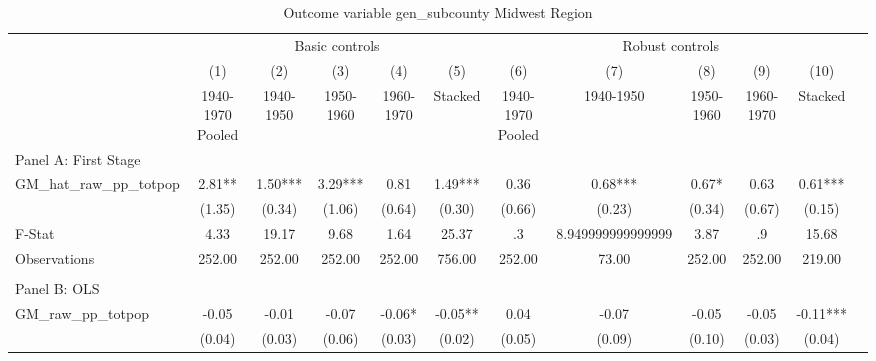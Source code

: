  \begin{table}[htbp]\centering {} \begin{threeparttable} \caption{Outcome variable gen\_subcounty Midwest Region} \begin{tabular}{l*{11}{c}} \toprule
          &\multicolumn{5}{c}{Basic controls}                                   &\multicolumn{5}{c}{Robust controls}                                  \\\cmidrule(lr){2-6}\cmidrule(lr){7-11}
          &\multicolumn{1}{c}{(1)}&\multicolumn{1}{c}{(2)}&\multicolumn{1}{c}{(3)}&\multicolumn{1}{c}{(4)}&\multicolumn{1}{c}{(5)}&\multicolumn{1}{c}{(6)}&\multicolumn{1}{c}{(7)}&\multicolumn{1}{c}{(8)}&\multicolumn{1}{c}{(9)}&\multicolumn{1}{c}{(10)}\\
          &\multicolumn{1}{c}{1940-1970 Pooled}&\multicolumn{1}{c}{1940-1950}&\multicolumn{1}{c}{1950-1960}&\multicolumn{1}{c}{1960-1970}&\multicolumn{1}{c}{Stacked}&\multicolumn{1}{c}{1940-1970 Pooled}&\multicolumn{1}{c}{1940-1950}&\multicolumn{1}{c}{1950-1960}&\multicolumn{1}{c}{1960-1970}&\multicolumn{1}{c}{Stacked}\\
\cmidrule(lr){1-11}
\multicolumn{10}{l}{Panel A: First Stage}\\
\cmidrule(lr){1-11}
GM\_hat\_raw\_pp\_totpop&      2.81** &      1.50***&      3.29***&      0.81   &      1.49***&      0.36   &      0.68***&      0.67*  &      0.63   &      0.61***\\
          &    (1.35)   &    (0.34)   &    (1.06)   &    (0.64)   &    (0.30)   &    (0.66)   &    (0.23)   &    (0.34)   &    (0.67)   &    (0.15)   \\
\midrule
F-Stat    &      4.33   &     19.17   &      9.68   &      1.64   &     25.37   &        .3   &8.949999999999999   &      3.87   &        .9   &     15.68   \\
Observations&    252.00   &    252.00   &    252.00   &    252.00   &    756.00   &    252.00   &     73.00   &    252.00   &    252.00   &    219.00   \\
\cmidrule[\heavyrulewidth](lr){1-11} \\ \cmidrule[\heavyrulewidth](lr){1-11}
\multicolumn{10}{l}{Panel B: OLS}\\
\cmidrule(lr){1-11}
GM\_raw\_pp\_totpop&     -0.05   &     -0.01   &     -0.07   &     -0.06*  &     -0.05** &      0.04   &     -0.07   &     -0.05   &     -0.05   &     -0.11***\\
          &    (0.04)   &    (0.03)   &    (0.06)   &    (0.03)   &    (0.02)   &    (0.05)   &    (0.09)   &    (0.10)   &    (0.03)   &    (0.04)   \\

\end{tabular}
\end{threeparttable}
\end{table}
